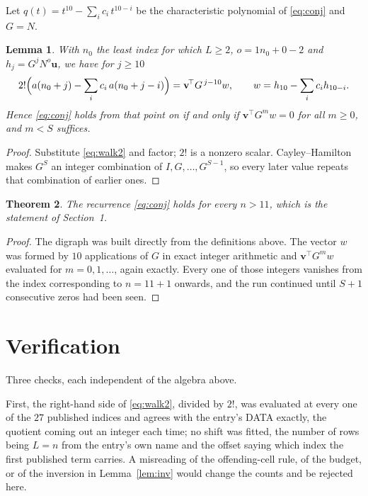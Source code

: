 \documentclass[11pt,a4paper]{article}
\theoremstyle{plain}
\newtheorem{theorem}{Theorem}
\newtheorem{lemma}[theorem]{Lemma}
\theoremstyle{definition}
\begin{document}
Let $q(t)=t^{10}-\sum_i c_i\,t^{10-i}$ be the characteristic polynomial of
\eqref{eq:conj} and $G=N$.

\begin{lemma}\label{lem:crit}
With $n_0$ the least index for which $L\ge2$, $o=1n_0+0-2$ and
$h_j=G^{j}N^{o}\mathbf{u}$, we have for $j\ge10$
\[
2!\Bigl(a(n_0+j)-\sum_i c_i\,a(n_0+j-i)\Bigr)=\mathbf{v}^{\!\top}G^{\,j-10}w,
\qquad w=h_{10}-\sum_i c_i h_{10-i} .
\]
Hence \eqref{eq:conj} holds from that point on if and only if
$\mathbf{v}^{\!\top}G^{m}w=0$ for all $m\ge0$, and $m<S$ suffices.
\end{lemma}

\begin{proof}
Substitute \eqref{eq:walk2} and factor; $2!$ is a nonzero scalar. Cayley--Hamilton
makes $G^{S}$ an integer combination of $I,G,\dots,G^{S-1}$, so every later value repeats
that combination of earlier ones.
\end{proof}

\begin{theorem}
The recurrence \eqref{eq:conj} holds for every $n>11$, which is the statement of
Section~1.
\end{theorem}

\begin{proof}
The digraph was built directly from the definitions above. The vector $w$ was formed by
$10$ applications of $G$ in exact integer arithmetic and $\mathbf{v}^{\!\top}G^{m}w$
evaluated for $m=0,1,\dots$, again exactly. Every one of those integers vanishes from the
index corresponding to $n=11+1$ onwards, and the run continued until $S+1$ consecutive
zeros had been seen.
\end{proof}

\section{Verification}

Three checks, each independent of the algebra above.

First, the right-hand side of \eqref{eq:walk2}, divided by $2!$, was evaluated at every
one of the $27$ published indices and agrees with the entry's DATA exactly, the quotient
coming out an integer each time; no shift was fitted, the number of rows being
$L=n$ from the entry's own name and the offset saying which index the first published
term carries. A misreading of the offending-cell rule, of the budget, or of the inversion in
Lemma~\ref{lem:inv} would change the counts and be rejected here.
\end{document}
